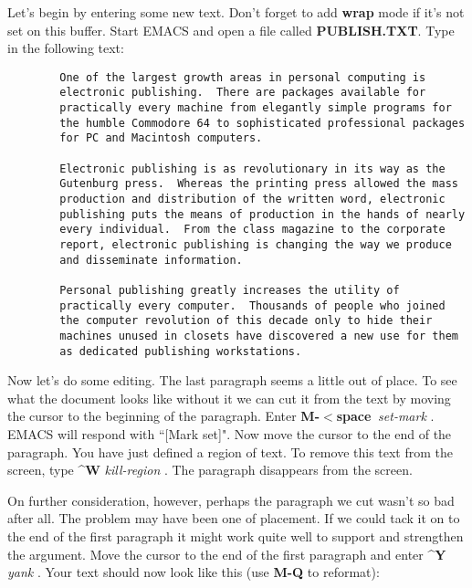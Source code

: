 Let's begin by entering some new text.  Don't forget to add {\bf{}wrap}
mode if it's not set on this buffer.  Start EMACS and open a file called
{\bf{}PUBLISH.TXT}.  Type in the following text:

\begin{verbatim}
        One of the largest growth areas in personal computing is
        electronic publishing.  There are packages available for
        practically every machine from elegantly simple programs for
        the humble Commodore 64 to sophisticated professional packages
        for PC and Macintosh computers.

        Electronic publishing is as revolutionary in its way as the
        Gutenburg press.  Whereas the printing press allowed the mass
        production and distribution of the written word, electronic
        publishing puts the means of production in the hands of nearly
        every individual.  From the class magazine to the corporate
        report, electronic publishing is changing the way we produce
        and disseminate information.

        Personal publishing greatly increases the utility of
        practically every computer.  Thousands of people who joined
        the computer revolution of this decade only to hide their
        machines unused in closets have discovered a new use for them
        as dedicated publishing workstations.
\end{verbatim}

Now let's do some editing.  The last paragraph seems a little out of
place.  To see what the document looks like without it we can cut it
from the text by moving the cursor to the beginning of the paragraph.
Enter {\bf{}M-$<${}space$\>${}} {\it{}set-mark} .
EMACS will respond with ``[Mark set]".  Now move the cursor to the end
of the paragraph.  You have just defined a region of text.  To remove
this text from the screen, type {\bf{}\^{}W} {\it{}kill-region}
.  The paragraph disappears from the screen.

On further consideration, however, perhaps the paragraph we cut wasn't
so bad after all.  The problem may have been one of placement.  If we
could tack it on to the end of the first paragraph it might work quite
well to support and strengthen the argument.  Move the cursor to the
end of the first paragraph and enter {\bf{}\^{}Y} {\it{}yank}
.  Your text should now look like this (use {\bf{}M-Q} to
reformat):


